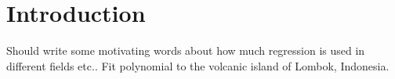 \section{Introduction} \label{sec:introduction}
Should write some motivating words about how much regression is used in different fields etc..
Fit polynomial to the volcanic island of Lombok, Indonesia.